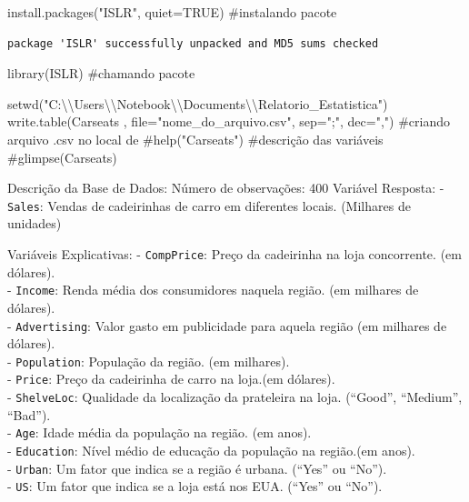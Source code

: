 \documentclass[
  letterpaper,
  DIV=11,
  numbers=noendperiod]{scrartcl}
\newenvironment{Shaded}{\begin{snugshade}}{\end{snugshade}}
\newcommand{\AttributeTok}[1]{\textcolor[rgb]{0.40,0.45,0.13}{#1}}
\newcommand{\CommentTok}[1]{\textcolor[rgb]{0.37,0.37,0.37}{#1}}
\newcommand{\ConstantTok}[1]{\textcolor[rgb]{0.56,0.35,0.01}{#1}}
\newcommand{\FunctionTok}[1]{\textcolor[rgb]{0.28,0.35,0.67}{#1}}
\newcommand{\NormalTok}[1]{\textcolor[rgb]{0.00,0.23,0.31}{#1}}
\newcommand{\SpecialCharTok}[1]{\textcolor[rgb]{0.37,0.37,0.37}{#1}}
\newcommand{\StringTok}[1]{\textcolor[rgb]{0.13,0.47,0.30}{#1}}
\begin{document}
\begin{Shaded}
\begin{Highlighting}[]
\FunctionTok{install.packages}\NormalTok{(}\StringTok{"ISLR"}\NormalTok{, }\AttributeTok{quiet=}\ConstantTok{TRUE}\NormalTok{) }\CommentTok{\#instalando pacote}
\end{Highlighting}
\end{Shaded}

\begin{verbatim}
package 'ISLR' successfully unpacked and MD5 sums checked
\end{verbatim}

\begin{Shaded}
\begin{Highlighting}[]
\FunctionTok{library}\NormalTok{(ISLR) }\CommentTok{\#chamando pacote}

\FunctionTok{setwd}\NormalTok{(}\StringTok{"C:}\SpecialCharTok{\textbackslash{}\textbackslash{}}\StringTok{Users}\SpecialCharTok{\textbackslash{}\textbackslash{}}\StringTok{Notebook}\SpecialCharTok{\textbackslash{}\textbackslash{}}\StringTok{Documents}\SpecialCharTok{\textbackslash{}\textbackslash{}}\StringTok{Relatorio\_Estatistica"}\NormalTok{)}
\FunctionTok{write.table}\NormalTok{(Carseats , }\AttributeTok{file=}\StringTok{"nome\_do\_arquivo.csv"}\NormalTok{, }\AttributeTok{sep=}\StringTok{";"}\NormalTok{, }\AttributeTok{dec=}\StringTok{","}\NormalTok{) }\CommentTok{\#criando arquivo .csv no local de }
\CommentTok{\#help("Carseats") \#descrição das variáveis}
\CommentTok{\#glimpse(Carseats)}
\end{Highlighting}
\end{Shaded}

Descrição da Base de Dados: Número de observações: 400 Variável
Resposta: - \texttt{Sales}: Vendas de cadeirinhas de carro em diferentes
locais. (Milhares de unidades)

Variáveis Explicativas: - \texttt{CompPrice}: Preço da cadeirinha na
loja concorrente. (em dólares).\\
- \texttt{Income}: Renda média dos consumidores naquela região. (em
milhares de dólares).\\
- \texttt{Advertising}: Valor gasto em publicidade para aquela região
(em milhares de dólares).\\
- \texttt{Population}: População da região. (em milhares).\\
- \texttt{Price}: Preço da cadeirinha de carro na loja.(em dólares).\\
- \texttt{ShelveLoc}: Qualidade da localização da prateleira na loja.
(``Good'', ``Medium'', ``Bad'').\\
- \texttt{Age}: Idade média da população na região. (em anos).\\
- \texttt{Education}: Nível médio de educação da população na região.(em
anos).\\
- \texttt{Urban}: Um fator que indica se a região é urbana. (``Yes'' ou
``No'').\\
- \texttt{US}: Um fator que indica se a loja está nos EUA. (``Yes'' ou
``No'').
\end{document}
